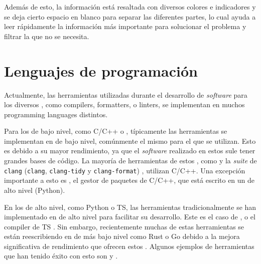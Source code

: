 Además de esto, la información está resaltada con diversos colores e indicadores
y se deja cierto espacio en blanco para separar las diferentes partes, lo cual
ayuda a leer rápidamente la información más importante para solucionar el
problema y filtrar la que no se necesita.


\FloatBarrier

\section{Lenguajes de programación}\label{sec:programming-languages}

Actualmente, las herramientas utilizadas durante el desarrollo de
\textit{software} para los diversos ,
como \glspl{compiler}, \glspl{formatter}, o \glspl{linter}, se implementan en
muchos \glspl{programming language} distintos.

Para los  de bajo nivel, como C/C++ o
, típicamente las herramientas se implementan en
 de bajo nivel, comúnmente el mismo
para el que se utilizan. Esto es debido a su mayor rendimiento, ya que el
\textit{software} realizado en estos 
sule tener grandes bases de código. La mayoría de herramientas de estos
, como  y la
\textit{suite} de \verb!clang! (\verb!clang!, \verb!clang-tidy! y
\verb!clang-format!) \parencite{clang}, utilizan C/C++. Una excepción importante
a esto es , el gestor de paquetes de C/C++, que está escrito en
un  de alto nivel (Python).

En los  de alto nivel, como Python o
\gls{TS}, las herramientas tradicionalmente se han implementado en
 de alto nivel para facilitar su
desarrollo. Este es el caso de ,  o el
\gls{compiler} de \gls{TS} \parencite{tsc}. Sin embargo, recientemente muchas de
estas herramientas se están reescribiendo en  de más bajo nivel como Rust o Go debido a la mejora
significativa de rendimiento que ofrecen estos  \parencite{typescript-go}. Algunos ejemplos de herramientas
que han tenido éxito con esto son  y .
